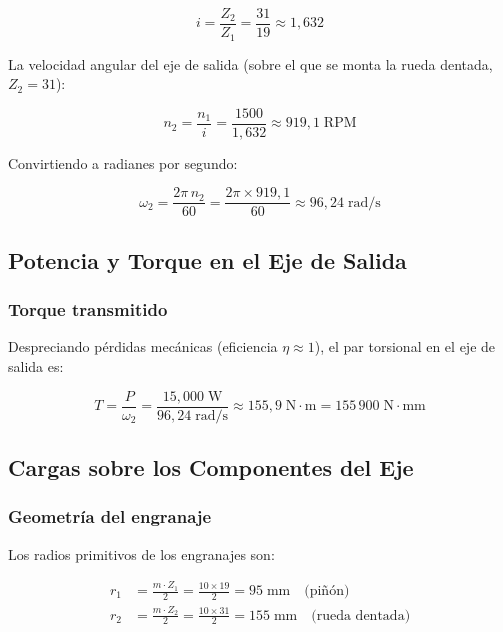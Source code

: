 \documentclass[conference]{IEEEtran}
\begin{document}
\begin{equation}
i = \frac{Z_2}{Z_1} = \frac{31}{19} \approx 1{,}632
\end{equation}

La velocidad angular del eje de salida (sobre el que se monta la rueda dentada,
$Z_2 = 31$):

\begin{equation}
n_2 = \frac{n_1}{i} = \frac{1500}{1{,}632} \approx 919{,}1\;\mathrm{RPM}
\end{equation}

Convirtiendo a radianes por segundo:

\begin{equation}
\omega_2 = \frac{2\pi \, n_2}{60} = \frac{2\pi \times 919{,}1}{60}
         \approx 96{,}24\;\mathrm{rad/s}
\end{equation}

\subsection{Potencia y Torque en el Eje de Salida}

\subsubsection{Torque transmitido}

Despreciando pérdidas mecánicas (eficiencia $\eta \approx 1$), el par torsional en el eje
de salida es:

\begin{equation}
T = \frac{P}{\omega_2} = \frac{15{,}000\;\mathrm{W}}{96{,}24\;\mathrm{rad/s}}
  \approx 155{,}9\;\mathrm{N{\cdot}m} = 155\,900\;\mathrm{N{\cdot}mm}
\end{equation}

\subsection{Cargas sobre los Componentes del Eje}

\subsubsection{Geometría del engranaje}

Los radios primitivos de los engranajes son:

\begin{align}
r_1 &= \frac{m \cdot Z_1}{2} = \frac{10 \times 19}{2} = 95\;\mathrm{mm}
       \quad \text{(piñón)}\\
r_2 &= \frac{m \cdot Z_2}{2} = \frac{10 \times 31}{2} = 155\;\mathrm{mm}
       \quad \text{(rueda dentada)}
\end{align}
\end{document}

